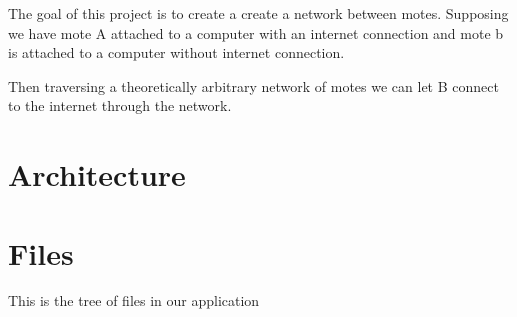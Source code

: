 \documentclass[11pt]{article}
\begin{document}
  The goal of this project is to create a create a network between motes.
  Supposing we have mote A attached to a computer with an internet connection and mote b is attached to a computer without internet connection.

  Then traversing a theoretically arbitrary network of motes we can let B connect to the internet through the network.
\section{Architecture}
\label{sec-3}

  
\section{Files}
\label{sec-4}

  This is the tree of files in our application
\end{document}
